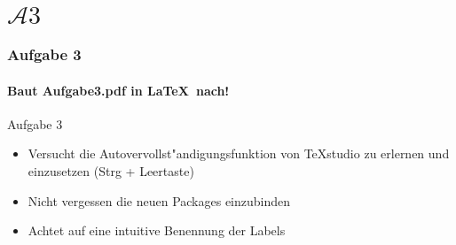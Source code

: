 \section{$\mathcal{A}3$} 
\begin{frame}
\frametitle{Aufgabe 3}
\framesubtitle{Baut Aufgabe3.pdf in \LaTeX ~nach!} 

\begin{block}{Aufgabe 3}
\begin{itemize}
\item Versucht die Autovervollst"andigungsfunktion von TeXstudio zu erlernen und einzusetzen
{\footnotesize(Strg + Leertaste)}
\item Nicht vergessen die neuen Packages einzubinden 
\item Achtet auf eine intuitive Benennung der Labels
\end{itemize}
\end{block}
\end{frame}